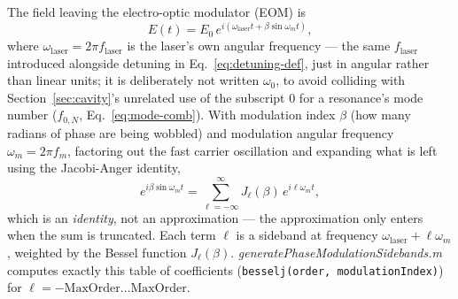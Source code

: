 \documentclass[9pt]{article}
\begin{document}
The field leaving the electro-optic modulator (EOM) is
\begin{equation}
E(t) = E_0\, e^{i(\omega_{\mathrm{laser}} t + \beta \sin\omega_m t)},
\label{eq:pm-field}
\end{equation}
where $\omega_{\mathrm{laser}} = 2\pi f_{\mathrm{laser}}$ is the laser's own
angular frequency --- the same $f_{\mathrm{laser}}$ introduced alongside
detuning in Eq.~\eqref{eq:detuning-def}, just in angular rather than linear
units; it is deliberately not written $\omega_0$, to avoid colliding with
Section~\ref{sec:cavity}'s unrelated use of the subscript $0$ for a
resonance's mode number ($f_{0,N}$, Eq.~\eqref{eq:mode-comb}). With
modulation index $\beta$ (how many radians of phase are being wobbled) and
modulation angular frequency $\omega_m = 2\pi f_m$, factoring out the
fast carrier oscillation and expanding what is left using the Jacobi-Anger
identity,
\begin{equation}
e^{i\beta\sin\omega_m t} = \sum_{\ell=-\infty}^{\infty} J_\ell(\beta)\, e^{i\ell\omega_m t},
\label{eq:jacobi-anger}
\end{equation}
which is an \emph{identity}, not an approximation --- the approximation only
enters when the sum is truncated. Each term $\ell$ is a sideband at frequency
$\omega_{\mathrm{laser}} + \ell\omega_m$, weighted by the Bessel function $J_\ell(\beta)$.
\textit{generatePhaseModulationSidebands.m} computes exactly this table of
coefficients (\verb|besselj(order, modulationIndex)|) for
$\ell=-\mathrm{MaxOrder}\ldots\mathrm{MaxOrder}$.
\end{document}
